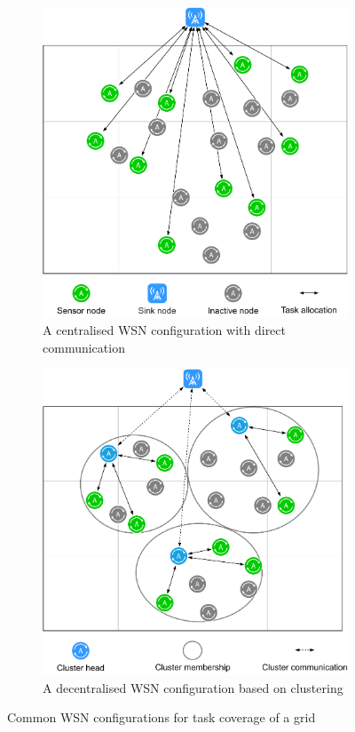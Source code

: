 \begin{figure}
	\begin{subfigure}{0.5\textwidth}
		\centering
		\includegraphics[width=.8\linewidth]{WSN_centralised}
		\caption{A centralised WSN configuration with direct communication}
		\label{fig:wsn_centralised}
	\end{subfigure}%
	\begin{subfigure}{0.5\textwidth}
		\centering
		\includegraphics[width=.8\linewidth]{WSN_clustering}
		\caption{A decentralised WSN configuration based on clustering}
		\label{fig:wsn_clustering}
	\end{subfigure}
	\caption{Common WSN configurations for task coverage of a grid}
	\label{fig:wsn_centralised_decentralised}
\end{figure}


